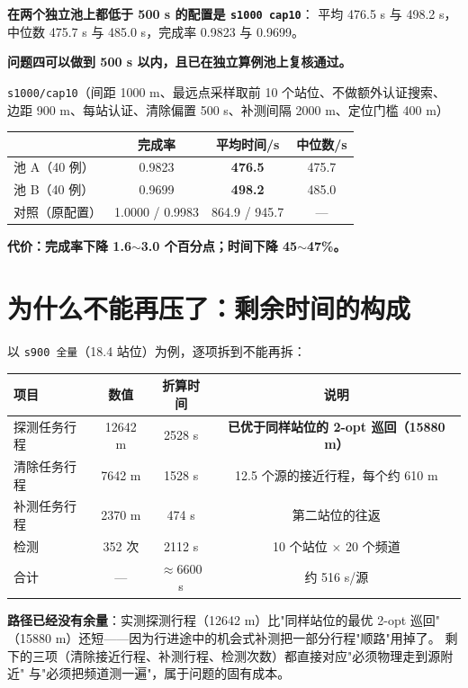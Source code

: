 \textbf{在两个独立池上都低于 500 s 的配置是 \texttt{s1000 cap10}}：
平均 476.5 s 与 498.2 s，中位数 475.7 s 与 485.0 s，完成率 0.9823 与 0.9699。

\begin{keybox}[title=最终答案]
\textbf{问题四可以做到 500 s 以内，且已在独立算例池上复核通过。}\par
\texttt{s1000/cap10}（间距 1000 m、最远点采样取前 10 个站位、不做额外认证搜索、
边距 900 m、每站认证、清除偏置 500 s、补测间隔 2000 m、定位门槛 400 m）\par
\begin{tabular}{lccc}
\toprule
 & 完成率 & 平均时间/s & 中位数/s \\ \midrule
池 A（40 例） & 0.9823 & \textbf{476.5} & 475.7 \\
池 B（40 例） & 0.9699 & \textbf{498.2} & 485.0 \\
对照（原配置） & 1.0000 / 0.9983 & 864.9 / 945.7 & --- \\
\bottomrule
\end{tabular}\par
\textbf{代价：完成率下降 1.6$\sim$3.0 个百分点；时间下降 45$\sim$47\%。}
\end{keybox}

\section{为什么不能再压了：剩余时间的构成}

以 \texttt{s900 全量}（18.4 站位）为例，逐项拆到不能再拆：

\begin{center}
\begin{tabular}{lccc}
\toprule
项目 & 数值 & 折算时间 & 说明 \\ \midrule
探测任务行程 & 12642 m & 2528 s & \textbf{已优于同样站位的 2-opt 巡回（15880 m）} \\
清除任务行程 & 7642 m & 1528 s & 12.5 个源的接近行程，每个约 610 m \\
补测任务行程 & 2370 m & 474 s & 第二站位的往返 \\
检测 & 352 次 & 2112 s & 10 个站位 $\times$ 20 个频道 \\
合计 & --- & $\approx$6600 s & 约 516 s/源 \\
\bottomrule
\end{tabular}
\end{center}

\textbf{路径已经没有余量}：实测探测行程（12642 m）比"同样站位的最优 2-opt 巡回"
（15880 m）还短——因为行进途中的机会式补测把一部分行程"顺路"用掉了。
剩下的三项（清除接近行程、补测行程、检测次数）都直接对应"必须物理走到源附近"
与"必须把频道测一遍"，属于问题的固有成本。

